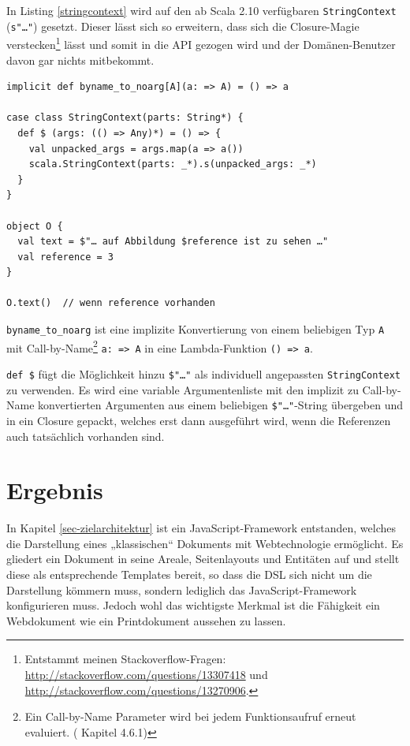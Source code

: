 In Listing \ref{stringcontext} wird auf den ab Scala 2.10 verfügbaren
\verb|StringContext| (\verb|s"…"|)
gesetzt. \cite{scala-stringInterpolation}
Dieser lässt sich so erweitern, dass
sich die Closure-Magie verstecken\footnote{Entstammt meinen
Stackoverflow-Fragen: \url{http://stackoverflow.com/questions/13307418} und
\url{http://stackoverflow.com/questions/13270906}.} lässt und somit in die API
gezogen wird und der Domänen-Benutzer davon gar nichts mitbekommt.

\begin{lstlisting}[label=stringcontext,caption=Erweiterter StringContext]
implicit def byname_to_noarg[A](a: => A) = () => a

case class StringContext(parts: String*) {
  def $ (args: (() => Any)*) = () => {
    val unpacked_args = args.map(a => a())
    scala.StringContext(parts: _*).s(unpacked_args: _*)
  }
}

object O {
  val text = $"… auf Abbildung $reference ist zu sehen …"
  val reference = 3
}

O.text()  // wenn reference vorhanden
\end{lstlisting}

\verb|byname_to_noarg| ist eine implizite Konvertierung von einem
beliebigen Typ \verb|A| mit Call-by-Name\footnote{Ein Call-by-Name
Parameter wird bei jedem Funktionsaufruf erneut evaluiert.
(\cite{scala-ref} Kapitel 4.6.1)}
\verb|a: => A| in eine Lambda-Funktion \verb|() => a|.

\verb|def $| fügt die Möglichkeit hinzu \verb|$"…"| als individuell
angepassten \verb|StringContext| zu verwenden. Es wird eine variable 
Argumentenliste mit den implizit zu Call-by-Name konvertierten Argumenten
aus einem beliebigen \verb|$"…"|-String übergeben und in ein Closure gepackt,
welches erst dann ausgeführt wird, wenn die Referenzen auch tatsächlich
vorhanden sind.


\section{Ergebnis}

In Kapitel \ref{sec-zielarchitektur} ist ein JavaScript-Framework entstanden,
welches die Darstellung eines „klassischen“ Dokuments mit Webtechnologie
ermöglicht.
Es gliedert ein Dokument in seine Areale, Seitenlayouts und Entitäten auf
und stellt diese als entsprechende Templates bereit, so dass die DSL sich
nicht um die Darstellung kömmern muss, sondern lediglich das
JavaScript-Framework konfigurieren muss.
Jedoch wohl das wichtigste Merkmal ist die Fähigkeit ein Webdokument wie
ein Printdokument aussehen zu lassen.

